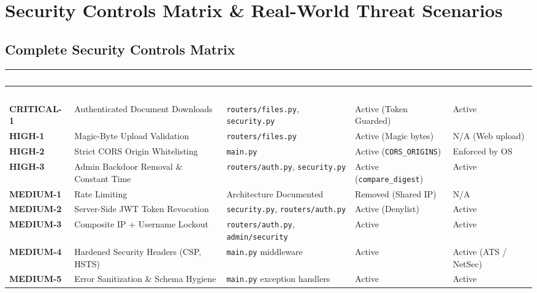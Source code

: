 \documentclass[11pt,a4paper]{article}
\newcommand{\theadstyle}[1]{\textcolor{white}{\bfseries #1}}
\begin{document}
\section{Security Controls Matrix \& Real-World Threat Scenarios}

\subsection{Complete Security Controls Matrix}
\begin{longtable}{>{\bfseries\small}L{1.8cm} L{3.0cm} L{3.4cm} L{2.2cm} L{2.2cm}}
\theadstyle{ID} & \theadstyle{Security Control} & \theadstyle{Implementation Location} & \theadstyle{Web Status} & \theadstyle{Mobile Status} \\
\endfirsthead
{}
\theadstyle{ID} & \theadstyle{Security Control} & \theadstyle{Implementation Location} & \theadstyle{Web Status} & \theadstyle{Mobile Status} \\
\endhead
CRITICAL-1 & Authenticated Document Downloads & \texttt{routers/files.py}, \texttt{security.py} & Active (Token Guarded) & Active \\
HIGH-1 & Magic-Byte Upload Validation & \texttt{routers/files.py} & Active (Magic bytes) & N/A (Web upload) \\
HIGH-2 & Strict CORS Origin Whitelisting & \texttt{main.py} & Active (\texttt{CORS\_ORIGINS}) & Enforced by OS \\
HIGH-3 & Admin Backdoor Removal \& Constant Time & \texttt{routers/auth.py}, \texttt{security.py} & Active (\texttt{compare\_digest}) & Active \\
MEDIUM-1 & Rate Limiting & Architecture Documented & Removed (Shared IP) & N/A \\
MEDIUM-2 & Server-Side JWT Token Revocation & \texttt{security.py}, \texttt{routers/auth.py} & Active (Denylist) & Active \\
MEDIUM-3 & Composite IP + Username Lockout & \texttt{routers/auth.py}, \texttt{admin/security} & Active & Active \\
MEDIUM-4 & Hardened Security Headers (CSP, HSTS) & \texttt{main.py} middleware & Active & Active (ATS / NetSec) \\
MEDIUM-5 & Error Sanitization \& Schema Hygiene & \texttt{main.py} exception handlers & Active & Active \\

\end{longtable}
\end{document}
